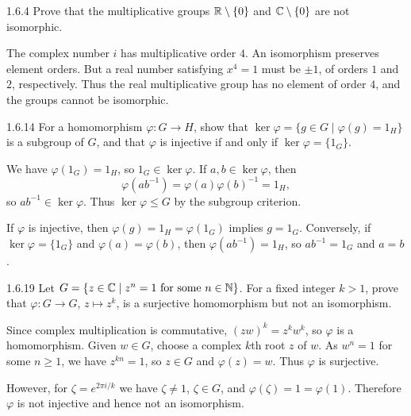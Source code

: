 \documentclass[11pt,oneside]{article}
\begin{document}
\begin{exercise}{1.6.4}
Prove that the multiplicative groups $\mathbb{R}\setminus\{0\}$ and $\mathbb{C}\setminus\{0\}$ are not isomorphic.
\end{exercise}

\begin{solution}
The complex number $i$ has multiplicative order $4$. An isomorphism preserves element orders. But a real number satisfying $x^4=1$ must be $\pm1$, of orders $1$ and $2$, respectively. Thus the real multiplicative group has no element of order $4$, and the groups cannot be isomorphic.
\end{solution}

\begin{exercise}{1.6.14}
For a homomorphism $\varphi:G\to H$, show that $\ker\varphi=\{g\in G\mid\varphi(g)=1_H\}$ is a subgroup of $G$, and that $\varphi$ is injective if and only if $\ker\varphi=\{1_G\}$.
\end{exercise}

\begin{solution}
We have $\varphi(1_G)=1_H$, so $1_G\in\ker\varphi$. If $a,b\in\ker\varphi$, then
\[
 \varphi(ab^{-1})=\varphi(a)\varphi(b)^{-1}=1_H,
\]
so $ab^{-1}\in\ker\varphi$. Thus $\ker\varphi\le G$ by the subgroup criterion.

If $\varphi$ is injective, then $\varphi(g)=1_H=\varphi(1_G)$ implies $g=1_G$. Conversely, if $\ker\varphi=\{1_G\}$ and $\varphi(a)=\varphi(b)$, then $\varphi(ab^{-1})=1_H$, so $ab^{-1}=1_G$ and $a=b$.
\end{solution}

\begin{exercise}{1.6.19}
Let $G=\{z\in\mathbb{C}\mid z^n=1\text{ for some }n\in\mathbb{N}\}$. For a fixed integer $k>1$, prove that $\varphi:G\to G$, $z\mapsto z^k$, is a surjective homomorphism but not an isomorphism.
\end{exercise}

\begin{solution}
Since complex multiplication is commutative, $(zw)^k=z^kw^k$, so $\varphi$ is a homomorphism. Given $w\in G$, choose a complex $k$th root $z$ of $w$. As $w^n=1$ for some $n\ge1$, we have $z^{kn}=1$, so $z\in G$ and $\varphi(z)=w$. Thus $\varphi$ is surjective.

However, for $\zeta=e^{2\pi i/k}$ we have $\zeta\ne1$, $\zeta\in G$, and $\varphi(\zeta)=1=\varphi(1)$. Therefore $\varphi$ is not injective and hence not an isomorphism.
\end{solution}
\end{document}
